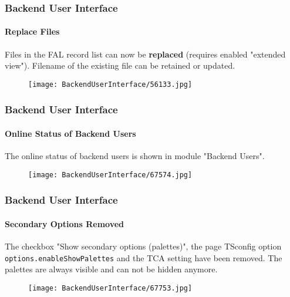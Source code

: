 \begin{frame}[fragile]
	\frametitle{Backend User Interface}
	\framesubtitle{Replace Files}

	Files in the FAL record list can now be \textbf{replaced} (requires enabled "extended view").
	Filename of the existing file can be retained or updated.

	\begin{figure}
		\texttt{[image: BackendUserInterface/56133.jpg]}
	\end{figure}

\end{frame}

\begin{frame}[fragile]
	\frametitle{Backend User Interface}
	\framesubtitle{Online Status of Backend Users}

	The online status of backend users is shown in module "Backend Users".

	\begin{figure}
		\texttt{[image: BackendUserInterface/67574.jpg]}
	\end{figure}

\end{frame}

\begin{frame}[fragile]
	\frametitle{Backend User Interface}
	\framesubtitle{Secondary Options Removed}

	The checkbox "Show secondary options (palettes)", the page TSconfig option \texttt{options.enableShowPalettes}
	and the TCA setting have been removed. The palettes are always visible and can not be hidden anymore.

	\begin{figure}
		\texttt{[image: BackendUserInterface/67753.jpg]}
	\end{figure}

\end{frame}

